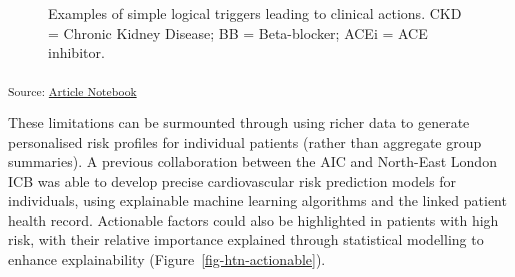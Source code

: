 \documentclass[
  letterpaper,
  DIV=11,
  numbers=noendperiod]{scrartcl}
\begin{document}
\begin{figure}


\caption{\label{fig-simple-pathway-action}Examples of simple logical
triggers leading to clinical actions. CKD = Chronic Kidney Disease; BB =
Beta-blocker; ACEi = ACE inhibitor.}

\end{figure}%

\textsubscript{Source:
\href{https://d3london.github.io/sde_aic_docs/index.qmd.html}{Article
Notebook}}

These limitations can be surmounted through using richer data to
generate personalised risk profiles for individual patients (rather than
aggregate group summaries). A previous collaboration between the AIC and
North-East London ICB was able to develop precise cardiovascular risk
prediction models for individuals, using explainable machine learning
algorithms and the linked patient health record. Actionable factors
could also be highlighted in patients with high risk, with their
relative importance explained through statistical modelling to enhance
explainability (Figure~\ref{fig-htn-actionable}).
\end{document}
